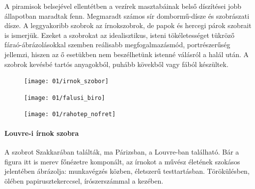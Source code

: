 A piramisok belsejével ellentétben a vezírek masztabáinak belső díszítései jobb állapotban maradtak fenn. Megmaradt számos sír dombormű-dísze és szobrászati dísze. A leggyakoribb szobrok az írnokszobrok, de papok és hercegi párok szobrait is ismerjük. Ezeket a szobrokat az idealisztikus, isteni tökéletességet tükröző fáraó-ábrázolásokkal szemben reálisabb megfogalmazásmód, portrészerűség jellemzi, hiszen az ő esetükben nem beszélhetünk istenné válásról a halál után. A szobrok kevésbé tartós anyagokból, puhább kövekből vagy fából készültek.

\begin{figure}
	\begin{minipage}{0.3\textwidth}
		\begin{tcolorbox}[enhanced,colframe=gray!50!white,
			colbacktitle=white!15!white,
			coltitle=gray!50!black,
			borderline={0.5mm}{0mm}{gray!15!white},
			borderline={0.5mm}{0mm}{gray!50!white,dashed},
			attach boxed title to top center={yshift=-2mm},
			boxed title style={boxrule=0.4pt},
			title=Ülő írnok szobra]{
				\texttt{[image: 01/irnok\_szobor]}}
		\end{tcolorbox}
	\end{minipage}
	\begin{minipage}{0.3\textwidth}
		\begin{tcolorbox}[enhanced,colframe=gray!50!white,
			colbacktitle=white!15!white,
			coltitle=gray!50!black,
			borderline={0.5mm}{0mm}{gray!15!white},
			borderline={0.5mm}{0mm}{gray!50!white,dashed},
			attach boxed title to top center={yshift=-2mm},
			boxed title style={boxrule=0.4pt},
			title=Falusi bíró szobra]{
				\texttt{[image: 01/falusi\_biro]}}
		\end{tcolorbox}
	\end{minipage}
	\begin{minipage}{0.3\textwidth}
		\begin{tcolorbox}[enhanced,colframe=gray!50!white,
			colbacktitle=white!15!white,
			coltitle=gray!50!black,
			borderline={0.5mm}{0mm}{gray!15!white},
			borderline={0.5mm}{0mm}{gray!50!white,dashed},
			attach boxed title to top center={yshift=-2mm},
			boxed title style={boxrule=0.4pt},
			title=Rahotep \& Nofret]{
				\texttt{[image: 01/rahotep\_nofret]}}
		\end{tcolorbox}
	\end{minipage}
\end{figure} 

\paragraph{Louvre-i írnok szobra}
A szobrot Szakkarában találták, ma Párizsban, a Louvre-ban található. Bár a figura itt is merev főnézetre komponált, az írnokot a művész életének szokásos jelentében ábrázolja: munkavégzés közben, életszerű testtartásban. Törökülésben, ölében papirusztekerccsel, írószerszámmal a kezében. 

